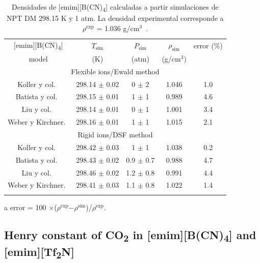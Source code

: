 \documentclass[3p,twocolumn]{elsarticle}
\begin{document}
\begin{table}
\caption{Densidades de [emim][B(CN)\textsubscript{4}] calculadas a partir simulaciones de NPT DM 298.15 K y 1 atm. La densidad experimental corresponde a $\rho^{\text{exp}}$ = 1.036 g/cm$^{3}$~\cite{Doma_ska_2011}.}
\begin{threeparttable}
\begin{tabular}{ c  c  c  c  c}  
\hline \hline
$\text{[emim]}$[B(CN)\textsubscript{4}] & $T_{\text{sim}}$ & $ P_{\text{sim}} $ & $\rho_{\text{sim}}$ & error (\%)\tnote{a} \\
model & (K) &  (atm) &  (g/cm$^{3}$) &  \\
			\hline
		 \multicolumn{5}{c}{Flexible ions/Ewald method}\\

Koller y col.~\cite{Koller_2012}  & 298.14 $\pm$  0.02 & 0 $\pm$ 2 & 1.046 & 1.0 \\
Batista y col.~\cite{Batista_2015} & 298.15 $\pm$ 0.01  & 1 $\pm$ 1 & 0.989 & 4.6  \\
Liu y col.~\cite{Liu_2014}  & 298.14 $\pm$ 0.01 & 0 $\pm$ 1 & 1.001 & 3.4  \\
Weber y Kirchner.~\cite{Weber_2016}  & 298.16  $\pm$ 0.01 & 1 $\pm$ 1 & 1.015 & 2.1  \\
	 \multicolumn{5}{c}{Rigid ions/DSF method}\\
Koller y col.~\cite{Koller_2012}   & 298.42  $\pm$ 0.03  & 1 $\pm$ 1 & 1.038 & 0.2 \\
Batista y col.~\cite{Batista_2015} & 298.43 $\pm$ 0.02  & 0.9 $\pm$ 0.7  & 0.988 & 4.7  \\
Liu y col.~\cite{Liu_2014}  & 298.46 $\pm$ 0.02 & 1.2  $\pm$ 0.8 & 0.991 &  4.4 \\
Weber y Kirchner.~\cite{Weber_2016} &  298.41 $\pm$ 0.03 & 1.1 $\pm$ 0.8 & 1.022 & 1.4  \\
 \hline \hline
\label{table:props_dsf} 
\end{tabular}
\begin{tablenotes}
\item[a] error = 100 $\times$($\rho^{\text{exp}}$$ - $$\rho^{\text{sim}}$)/$\rho^{\text{exp}}$.
\end{tablenotes}
\end{threeparttable}
\end{table}

\subsection{Henry constant of CO\textsubscript{2} in [emim][B(CN)\textsubscript{4}] and [emim][Tf\textsubscript{2}N]}
\label{sec:henry_results}
\end{document}
